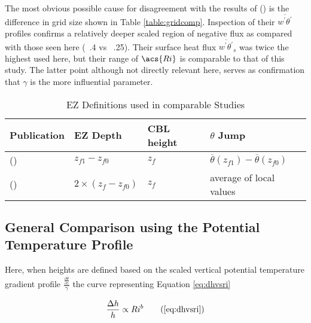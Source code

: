 The most obvious possible cause for disagreement with the results of \citeauthor{FedConzMir04} (\citeyear{FedConzMir04}) is the difference in grid size shown in Table \ref{table:gridcomp}.  Inspection of their $\overline{w^{'}\theta^{'}}$ profiles confirms a relatively deeper scaled region of negative flux as compared with those seen here (~.4 vs ~.25). Their surface heat flux $\overline{w^{'}\theta^{'}}_{s}$ was twice the highest used here, but their range of $\acs{Ri}$ is comparable to that of this study.  The latter point although not directly relevant here, serves as confirmation that $\gamma$ is the more influential parameter.\\              

\begin{table}[htbp]
\label{table:elandri}
\caption[\acs{EZ} Definitions used in comparable Studies]{\acs{EZ} Definitions used in comparable Studies}

\begin{center}
\begin{tabular}{ p{4cm} p{2cm} p{1.5cm} p{3cm}}

Publication & \acs{EZ} Depth & \acs{CBL} height & $\theta$ Jump\\ \hline
\citeauthor{FedConzMir04} (\citeyear{FedConzMir04}) & $z_{f1} - z_{f0}$ & $z_{f}$ &  $\overline{\theta}(z_{f1})-\overline{\theta}(z_{f0})$\\ [.3cm] %
\citeauthor{BrooksFowler2} (\citeyear{BrooksFowler2}) & $2 \times (z_{f} - z_{f0})$ & $z_{f}$ & average of local values\\ \hline

\end{tabular}
\end{center}    
\end{table}

\subsection{General Comparison using the Potential Temperature Profile}

Here, when heights are defined based on the scaled vertical potential temperature gradient profile $\frac{\frac{\partial \overline{\theta}}{\partial z}}{\gamma}$ the curve representing Equation \ref{eq:dhvsri} 

\begin{equation}
\frac{\Delta h}{h} \propto Ri^{b} \tag{\ref{eq:dhvsri}}
\end{equation}

